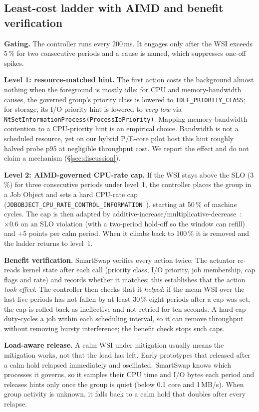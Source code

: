 \subsection{Least-cost ladder with AIMD and benefit verification}

\textbf{Gating.} The controller runs every 200\,ms. It engages only after the WSI exceeds 5\,\% for two consecutive periods and a cause is named, which suppresses one-off spikes.

\textbf{Level 1: resource-matched hint.} The first action costs the background almost nothing when the foreground is mostly idle: for CPU and memory-bandwidth causes, the governed group's priority class is lowered to \texttt{IDLE\_PRIORITY\_CLASS}; for storage, its I/O priority hint is lowered to \emph{very low} via \texttt{NtSetInformationProcess(ProcessIoPriority)}. Mapping memory-bandwidth contention to a CPU-priority hint is an empirical choice. Bandwidth is not a scheduled resource, yet on our hybrid P/E-core pilot host this hint roughly halved probe p95 at negligible throughput cost. We report the effect and do not claim a mechanism (\S\ref{sec:discussion}).

\textbf{Level 2: AIMD-governed CPU-rate cap.} If the WSI stays above the SLO (3\,\%) for three consecutive periods under level~1, the controller places the group in a Job Object and sets a hard CPU-rate cap (\texttt{JOBOBJECT\_CPU\_RATE\_CONTROL\_INFORMATION}~\cite{msjobobjects}), starting at 50\,\% of machine cycles. The cap is then adapted by additive-increase/multiplicative-decrease~\cite{chiu1989aimd}: $\times0.6$ on an SLO violation (with a two-period hold-off so the window can refill) and $+5$ points per calm period. When it climbs back to 100\,\% it is removed and the ladder returns to level~1.

\textbf{Benefit verification.} SmartSwap verifies every action twice. The actuator re-reads kernel state after each call (priority class, I/O priority, job membership, cap flags and rate) and records whether it matches; this establishes that the action \emph{took effect}. The controller then checks that it \emph{helped}: if the mean WSI over the last five periods has not fallen by at least 30\,\% eight periods after a cap was set, the cap is rolled back as ineffective and not retried for ten seconds. A hard cap duty-cycles a job within each scheduling interval, so it can remove throughput without removing bursty interference; the benefit check stops such caps.

\textbf{Load-aware release.} A calm WSI under mitigation usually means the mitigation works, not that the load has left. Early prototypes that released after a calm hold relapsed immediately and oscillated. SmartSwap knows which processes it governs, so it samples their CPU time and I/O bytes each period and releases hints only once the group is quiet (below 0.1 core and 1\,MB/s). When group activity is unknown, it falls back to a calm hold that doubles after every relapse.

